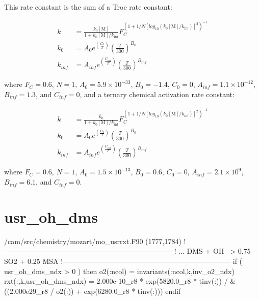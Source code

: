 \documentclass[titlepage]{article}
\begin{document}
This rate constant is the sum of a Troe rate constant:

\begin{equation}
\begin{split}
k & = \frac{k_0[\mbox{M}]}{1+k_0[\mbox{M}]/k_{\inf}}F_C^{(1+1/N[log_{10}(k_0[\mbox{M}]/k_{\inf})]^2)^{-1}} \\
k_0 & = A_0 e^{\left( \frac{C_0}{T} \right)} \left( \frac{T}{300} \right)^{B_0} \\
k_{inf} & = A_{inf} e^{\left( \frac{C_{inf}}{T} \right)} \left( \frac{T}{300} \right)^{B_{inf}}
\end{split}
\end{equation}

\noindent where $F_C = 0.6$, $N = 1$, $A_0 = 5.9 \times 10^{-33}$, $B_0 = -1.4$, $C_0 = 0$, $A_{inf} = 1.1 \times 10^{-12}$, $B_{inf} = 1.3$, and $C_{inf} = 0$, and a ternary chemical activation rate constant:

\begin{equation}
\begin{split}
k & = \frac{k_0}{1+k_0[\mbox{M}]/k_{\inf}}F_C^{(1+1/N[log_{10}(k_0[\mbox{M}]/k_{\inf})]^2)^{-1}} \\
k_0 & = A_0 e^{\left( \frac{C_0}{T} \right)} \left( \frac{T}{300} \right)^{B_0} \\
k_{inf} & = A_{inf} e^{\left( \frac{C_{inf}}{T} \right)} \left( \frac{T}{300} \right)^{B_{inf}}
\end{split}
\end{equation}

\noindent where $F_C = 0.6$, $N = 1$, $A_0 = 1.5 \times 10^{-13}$, $B_0 = 0.6$, $C_0 = 0$, $A_{inf} = 2.1 \times 10^{9}$, $B_{inf} = 6.1$, and $C_{inf} = 0$.


\section{usr\_oh\_dms}

\begin{blockcode}[commandchars=\\\{\}]
\color{gray}/cam/src/chemistry/mozart/mo_usrrxt.F90 (1777,1784)
       !-----------------------------------------------------------------------
       !     ... DMS + OH --> 0.75 SO2 + 0.25 MSA
       !-----------------------------------------------------------------------
       if ( usr_oh_dms_ndx > 0 ) then
          o2(:ncol) = invariants(:ncol,k,inv_o2_ndx)
          rxt(:,k,usr_oh_dms_ndx) = 2.000e-10_r8 * exp(5820.0_r8 * tinv(:)) / &
               ((2.000e29_r8 / o2(:)) + exp(6280.0_r8 * tinv(:)))
       endif
\end{blockcode}
\end{document}
